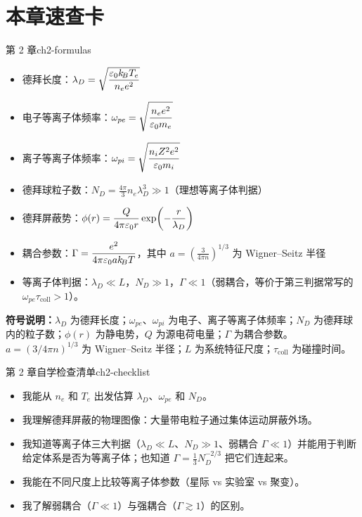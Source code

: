 \section*{本章速查卡}
{}
\begin{formulabox}{第 2 章}{ch2-formulas}
\begin{itemize}[leftmargin=*,itemsep=0pt]
\item 德拜长度：$\displaystyle\lambda_D = \sqrt{\frac{\varepsilon_0 k_{\!B}T_e}{n_e e^2}}$
\item 电子等离子体频率：$\displaystyle\omega_{pe} = \sqrt{\frac{n_e e^2}{\varepsilon_0 m_e}}$
\item 离子等离子体频率：$\displaystyle\omega_{pi} = \sqrt{\frac{n_i Z^2 e^2}{\varepsilon_0 m_i}}$
\item 德拜球粒子数：$\displaystyle N_D = \frac{4\pi}{3} n_e \lambda_D^3 \gg 1$（理想等离子体判据）
\item 德拜屏蔽势：$\displaystyle\phi(r) = \frac{Q}{4\pi\varepsilon_0 r}\exp\!\left(-\frac{r}{\lambda_D}\right)$
\item 耦合参数：$\displaystyle\Gamma = \frac{e^2}{4\pi\varepsilon_0 a k_{\!B}T}$，其中 $a=\left(\frac{3}{4\pi n}\right)^{1/3}$ 为 Wigner--Seitz 半径
\item 等离子体判据：$\lambda_D\ll L$，$N_D\gg 1$，$\Gamma\ll 1$（弱耦合，等价于第三判据常写的 $\omega_{pe}\tau_{\text{coll}}>1$）。
\end{itemize}
\textbf{符号说明：}$\lambda_D$ 为德拜长度；$\omega_{pe}$、$\omega_{pi}$ 为电子、离子等离子体频率；$N_D$ 为德拜球内的粒子数；$\phi(r)$ 为静电势，$Q$ 为源电荷电量；$\Gamma$ 为耦合参数。$a=(3/4\pi n)^{1/3}$ 为 Wigner--Seitz 半径；$L$ 为系统特征尺度；$\tau_{\text{coll}}$ 为碰撞时间。
\end{formulabox}

\begin{checklistbox}{第 2 章自学检查清单}{ch2-checklist}
\begin{itemize}[leftmargin=*,label=$\square$]
\item 我能从 $n_e$ 和 $T_e$ 出发估算 $\lambda_D$、$\omega_{pe}$ 和 $N_D$。
\item 我理解德拜屏蔽的物理图像：大量带电粒子通过集体运动屏蔽外场。
\item 我知道等离子体三大判据（$\lambda_D\ll L$、$N_D\gg 1$、弱耦合 $\Gamma\ll 1$）并能用于判断给定体系是否为等离子体；也知道 $\Gamma=\frac13N_D^{-2/3}$ 把它们连起来。
\item 我能在不同尺度上比较等离子体参数（星际 vs 实验室 vs 聚变）。
\item 我了解弱耦合（$\Gamma\ll 1$）与强耦合（$\Gamma\gtrsim 1$）的区别。
\end{itemize}
\end{checklistbox}


\endinput
